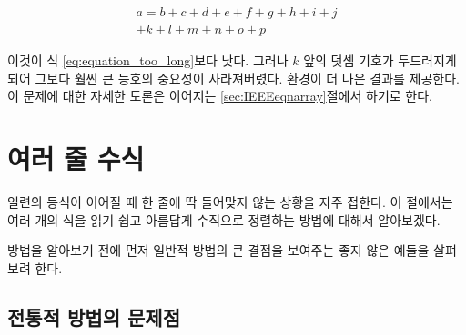 \begin{examplek}
\begin{multline}
  a = b + c + d + e + f 
  + g + h + i + j \\
  + k + l + m + n + o + p
\end{multline}
\end{examplek}

\noindent 이것이 식 \eqref{eq:equation_too_long}보다 낫다. 그러나 $k$ 앞의 
덧셈 기호가 두드러지게 되어 그보다 훨씬 큰 등호의 중요성이 사라져버렸다.
 환경이 더 나은 결과를 제공한다. 이 문제에 대한 자세한 토론은 이어지는 \ref{sec:IEEEeqnarray}절에서 
하기로 한다.

\section{여러 줄 수식}
\label{sec:IEEEeqnarray}

일련의 등식이 이어질 때 한 줄에 딱 들어맞지 않는 상황을 자주 접한다.
이 절에서는 여러 개의 식을 읽기 쉽고 아름답게 수직으로 정렬하는 방법에 대해서 알아보겠다.

방법을 알아보기 전에 먼저 일반적 방법의 큰 결점을 보여주는 좋지 않은 예들을 살펴보려 한다.

\subsection{전통적 방법의 문제점}
\label{sec:problems_traditional}

